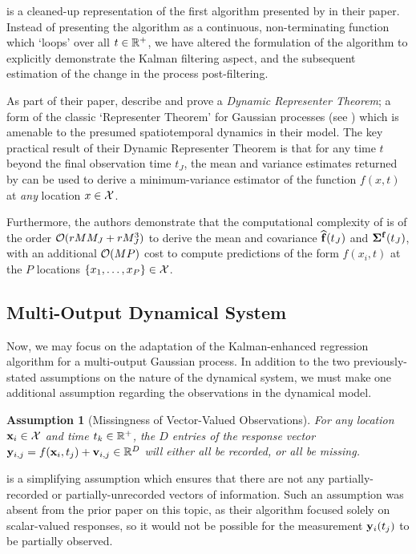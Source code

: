 \documentclass[10pt]{article}
\newtheorem{assumption}{Assumption}
\begin{document}
 is a cleaned-up representation of the first algorithm presented by \citeauthor{Todescato-Efficient-2020} in their paper. Instead of presenting the algorithm as a continuous, non-terminating function which `loops' over all $t \in \mathbb{R}^{+}$, we have altered the formulation of the algorithm to explicitly demonstrate the Kalman filtering aspect, and the subsequent estimation of the change in the process post-filtering. 


As part of their paper, \citeauthor{Todescato-Efficient-2020} describe and prove a \emph{Dynamic Representer Theorem}; a form of the classic `Representer Theorem' for Gaussian processes (see ) which is amenable to the presumed spatiotemporal dynamics in their model. The key  practical result of their Dynamic Representer Theorem is that for any time $t$ beyond the final observation time $t_{J}$, the mean and variance estimates returned by  can be used to derive a minimum-variance estimator of the function $f(x, t)$ at \emph{any} location $x \in \mathcal{X}$.

Furthermore, the authors demonstrate that the computational complexity of  is of the order $\mathcal{O}(rMM_{J} + rM_{J}^{3})$ to derive the mean and covariance $\widehat{\mathbf{f}}(t_{J})$ and $\bm{\Sigma}^{\mathbf{f}}(t_{J})$, with an additional $\mathcal{O}(MP)$ cost to compute predictions of the form $f(x_{i}, t)$ at the $P$ locations $\{x_{1}, \dots, x_{P}\} \in \mathcal{X}$.     


\subsection{Multi-Output Dynamical System}
Now, we may focus on the adaptation of the Kalman-enhanced regression algorithm for a multi-output Gaussian process. In addition to the two previously-stated assumptions on the nature of the dynamical system, we must make one additional assumption regarding the observations in the dynamical model.
\begin{assumption}[Missingness of Vector-Valued Observations]
\label{ass:all-or-nothing}
    For any location $\mathbf{x}_{i} \in \mathcal{X}$ and time $t_{k} \in \mathbb{R}^{+}$, the $D$ entries of the response vector $\mathbf{y}_{i,j} = f(\mathbf{x}_{i}, t_{j}) + \mathbf{v}_{i,j} \in \mathbb{R}^{D}$ will either all be recorded, or all be missing.
\end{assumption}
 is a simplifying assumption which ensures that there are not any partially-recorded or partially-unrecorded vectors of information. Such an assumption was absent from the prior paper on this topic, as their algorithm focused solely on scalar-valued responses, so it would not be possible for the measurement $\mathbf{y}_{i}(t_{j})$ to be partially observed.
\end{document}

